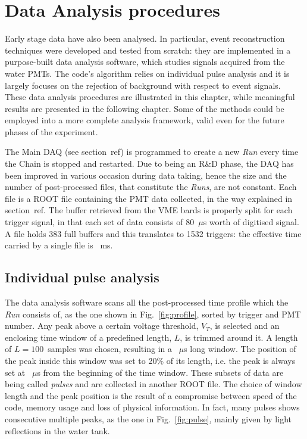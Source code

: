 
\chapter{Data Analysis procedures}
\label{cha:4}
 Early stage data have also been analysed.
 In particular, event reconstruction techniques were developed and tested from scratch: %
 they are implemented in a purpose-built data analysis software, which studies signals acquired %
 from the water PMTs.
 The code's algorithm relies on individual pulse analysis and it is largely focuses on the rejection of %
 background with respect to event signals.
 These data analysis procedures are illustrated in this chapter, while meaningful results %
 are presented in the following chapter.
 Some of the methods could be employed into a more complete analysis %
 framework, valid even for the future phases of the experiment.


 The Main DAQ (see section~ref) is programmed to create a new \emph{Run} every time the Chain is %
 stopped and restarted.
 Due to being an R\&D phase, the DAQ has been improved in various occasion during data taking, %
 hence the size and the number of post-processed files, that constitute the \emph{Runs}, are not constant.
 Each file is a ROOT file containing the PMT data collected, in the way explained in section~ref.
 The buffer retrieved from the VME bards is properly split for each trigger signal, in that each %
 set of data consists of 80~$\mu$s worth of digitised signal.
 A file holds 383 full buffers and this translates to 1532 triggers: the effective time carried by %
 a single file is ~ms.

\section{Individual pulse analysis}

 The data analysis software scans all the post-processed time profile which the \emph{Run} consists of, %
 as the one shown in Fig.~\ref{fig:profile}, sorted by trigger and PMT number.
 Any peak above a certain voltage threshold, $V_T$, is selected and an enclosing time window %
 of a predefined length, $L$, is trimmed around it.
 A length of $L = 100$~samples was chosen, resulting in a ~$\mu$s long window.
 The position of the peak inside this window was set to 20\% of its length, i.e. the peak is always %
 set at ~$\mu$s from the beginning of the time window.
 These subsets of data are being called \emph{pulses} and are collected in another ROOT file.
 The choice of window length and the peak position is the result of a compromise between speed of the code, %
 memory usage and loss of physical information.
 In fact, many pulses shows consecutive multiple peaks, as the one in Fig.~\ref{fig:pulse}, mainly given by %
 light reflections in the water tank.

